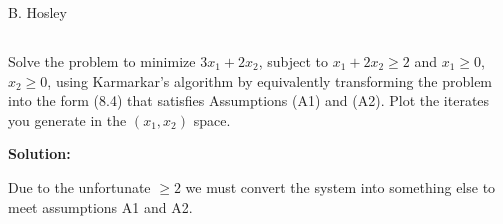 \documentclass[12pt]{amsart}
\begin{document}
\raggedbottom

\hspace{\fill} {\large B. Hosley}
\bigskip


\setcounter{section}{8}
\setcounter{subsection}{0}
\subsection{}
Solve the problem to minimize  \(3x_1 + 2x_2\), subject to \(x_1 + 2x_2 \geq 2\) and \(x_1 \geq 0\), 
\(x_2 \geq 0\), using Karmarkar's algorithm by equivalently transforming the problem into 
the form (8.4) that satisfies Assumptions (A1) and (A2). Plot the iterates you 
generate in the \(( x_1 ,x_2 )\) space.

\bigskip
\textbf{Solution:}

Due to the unfortunate \(\geq2\) we must convert the system into something else to meet 
assumptions A1 and A2.
\end{document}
